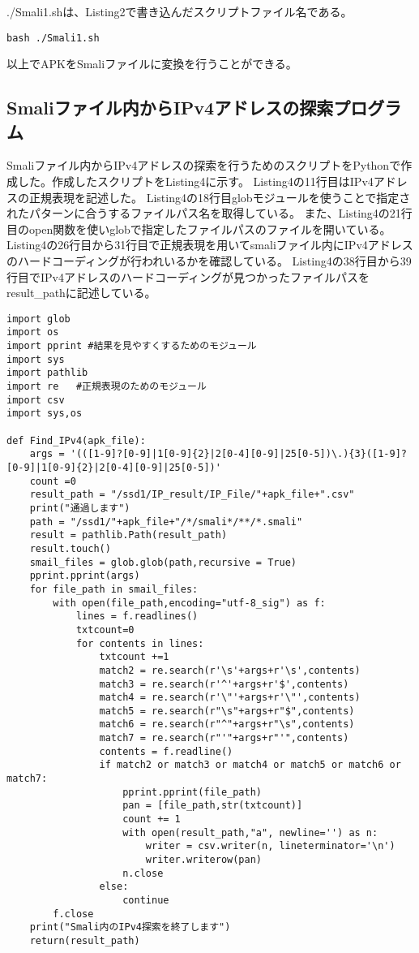 \documentclass[a4j]{jarticle}
\begin{document}
./Smali1.shは、Listing2で書き込んだスクリプトファイル名である。
\begin{lstlisting}[caption=シェルスクリプトの実行方法]
bash ./Smali1.sh　
\end{lstlisting}
以上でAPKをSmaliファイルに変換を行うことができる。

\subsection{Smaliファイル内からIPv4アドレスの探索プログラム}
Smaliファイル内からIPv4アドレスの探索を行うためのスクリプトをPythonで作成した。作成したスクリプトをListing4に示す。
Listing4の11行目はIPv4アドレスの正規表現を記述した。
Listing4の18行目globモジュールを使うことで指定されたパターンに合うするファイルパス名を取得している。
また、Listing4の21行目のopen関数を使いglobで指定したファイルパスのファイルを開いている。
Listing4の26行目から31行目で正規表現を用いてsmaliファイル内にIPv4アドレスのハードコーディングが行われいるかを確認している。
Listing4の38行目から39行目でIPv4アドレスのハードコーディングが見つかったファイルパスをresult\_pathに記述している。
\begin{lstlisting}[caption=Smaliファイル内からIPv4アドレスの探索を行うためのPythonスクリプト]
import glob
import os
import pprint #結果を見やすくするためのモジュール
import sys
import pathlib
import re   #正規表現のためのモジュール
import csv
import sys,os

def Find_IPv4(apk_file):
	args = '(([1-9]?[0-9]|1[0-9]{2}|2[0-4][0-9]|25[0-5])\.){3}([1-9]?[0-9]|1[0-9]{2}|2[0-4][0-9]|25[0-5])'
	count =0
	result_path = "/ssd1/IP_result/IP_File/"+apk_file+".csv"
	print("通過します")
	path = "/ssd1/"+apk_file+"/*/smali*/**/*.smali"
	result = pathlib.Path(result_path)
	result.touch()
	smail_files = glob.glob(path,recursive = True)
	pprint.pprint(args)
	for file_path in smail_files:
		with open(file_path,encoding="utf-8_sig") as f:
			lines = f.readlines()
			txtcount=0
			for contents in lines:
				txtcount +=1
				match2 = re.search(r'\s'+args+r'\s',contents)
				match3 = re.search(r'^'+args+r'$',contents)
				match4 = re.search(r'\"'+args+r'\"',contents)
				match5 = re.search(r"\s"+args+r"$",contents)
				match6 = re.search(r"^"+args+r"\s",contents)
				match7 = re.search(r"'"+args+r"'",contents)
				contents = f.readline()
				if match2 or match3 or match4 or match5 or match6 or match7:
					pprint.pprint(file_path)
					pan = [file_path,str(txtcount)]
					count += 1
					with open(result_path,"a", newline='') as n:
						writer = csv.writer(n, lineterminator='\n')
						writer.writerow(pan)
					n.close
				else:
					continue
		f.close
	print("Smali内のIPv4探索を終了します")
	return(result_path)
		
\end{lstlisting}
\end{document}
